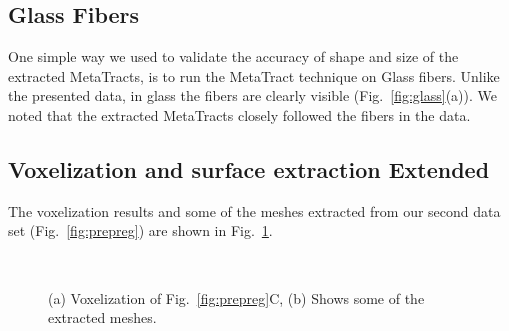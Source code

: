\subsection{Glass Fibers}
One simple way we used to validate the accuracy of shape and size of the extracted MetaTracts, is to run the MetaTract technique on Glass fibers.
Unlike the presented data, in glass the fibers are clearly visible (Fig.~\ref{fig:glass}(a)). We noted that the extracted MetaTracts closely followed the fibers in the data.
\subsection{Voxelization and surface extraction Extended}
The voxelization results and some of the meshes extracted from our second data set (Fig.~\ref{fig:prepreg}) are shown in Fig.~\ref{fig:vox_extended}.
\begin{figure}[h]
\centering

\\
\caption{(a) Voxelization of Fig.~\ref{fig:prepreg}C, (b) Shows some of the extracted meshes.}
\label{fig:vox_extended}
\end{figure}
